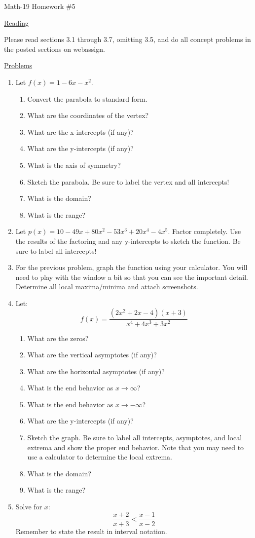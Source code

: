 \documentclass[letterpaper,12pt,fleqn]{article}
\begin{document}
\begin{center}
\Large Math-19 Homework \#5
\end{center}

\vspace{0.5in}

\underline{Reading}

Please read sections 3.1 through 3.7, omitting 3.5, and do all concept problems
in the posted sections on web\-assign.

\underline{Problems}

\begin{enumerate}
\item Let $f(x)=1-6x-x^2$.
\begin{enumerate}
\item Convert the parabola to standard form.
\item What are the coordinates of the vertex?
\item What are the x-intercepts (if any)?
\item What are the y-intercepts (if any)?
\item What is the axis of symmetry?
\item Sketch the parabola. Be sure to label the vertex and all intercepts!
\item What is the domain?
\item What is the range?
\end{enumerate}

\item Let $p(x)=10-49x+80x^2-53x^3+20x^4-4x^5$. Factor completely. Use the
results of the factoring and any y-intercepts to sketch the function. Be sure
to label all intercepts!

\item For the previous problem, graph the function using your calculator. You
will need to play with the window a bit so that you can see the important
detail. Determine all local maxima/minima and attach screenshots.

\item Let:
\[f(x)=\frac{(2x^2+2x-4)(x+3)}{x^4+4x^3+3x^2}\]
\begin{enumerate}
\item What are the zeros?
\item What are the vertical asymptotes (if any)?
\item What are the horizontal asymptotes (if any)?
\item What is the end behavior as $x\to\infty$?
\item What is the end behavior as $x\to-\infty$?
\item What are the y-intercepts (if any)?
\item Sketch the graph. Be sure to label all intercepts, asymptotes, and
local extrema and show the proper end behavior. Note that you may need to use a
calculator to determine the local extrema.
\item What is the domain?
\item What is the range?
\end{enumerate}

\item Solve for $x$:
\[\frac{x+2}{x+3}<\frac{x-1}{x-2}\]
Remember to state the result in interval notation.
\end{enumerate}
\end{document}

